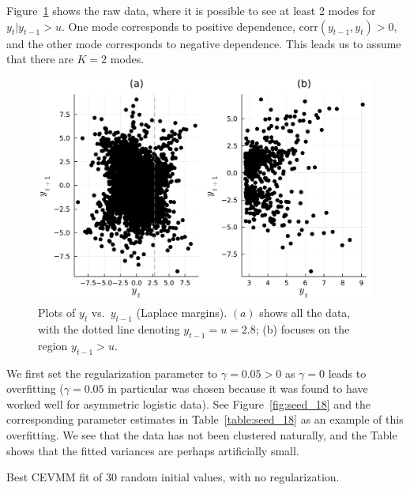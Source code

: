 \documentclass[11pt,twoside,openany]{book}
\numberwithin{Theorem}{chapter}
\numberwithin{Definition}{chapter}
\numberwithin{Lemma}{chapter}
\numberwithin{Algorithm}{chapter}
\numberwithin{equation}{chapter}
\begin{document}
Figure~\ref{fig:imb_first_order_tail} shows the raw data, where it is
possible to see at least 2 modes for $y_{t} | y_{t-1} > u$.
One mode corresponds to positive dependence, $\mathrm{corr}(y_{t-1},y_{t}) > 0$,
and the other mode corresponds to negative dependence. This leads us to assume that
there are $K=2$ modes.

\begin{figure}[htp]
  \centering
  \includegraphics[scale=0.75]{../elexon/figures/first-order-raw.pdf}
  \caption{Plots of $y_t$ vs.\ $y_{t-1}$ (Laplace margins). $(a)$ shows all the data,
    with the dotted line denoting $y_{t-1}=u=2.8$; (b) focuses on the region $y_{t-1}>u$.}\label{fig:imb_first_order_tail}
\end{figure}

We first set the regularization parameter to $\gamma=0.05>0$ as
$\gamma = 0$ leads to overfitting ($\gamma = 0.05$ in particular was chosen
because it was found to have worked well for asymmetric logistic data).
See Figure~\ref{fig:seed_18} and the corresponding
parameter estimates in Table~\ref{table:seed_18} as an example of this overfitting.
We see that the data has not been
clustered naturally, and the Table shows that the fitted variances
are perhaps artificially small.

\begin{table}[htp]\centering
   \caption{Best CEVMM fit of 30 random initial values, with no regularization.\label{table:seed_18} }
\end{table}
\end{document}
